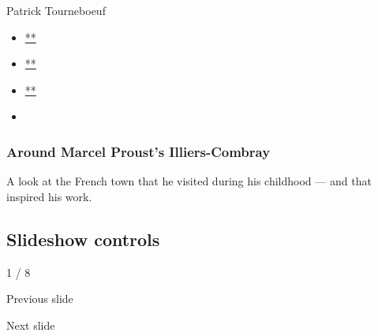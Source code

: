 Patrick Tourneboeuf

\begin{itemize}
\item
  \href{https://www.facebookcorewwwi.onion/sharer.php?app_id=9869919170\&u=https\%3A\%2F\%2Fwww.nytimes3xbfgragh.onion\%2Fslideshow\%2F2017\%2F05\%2F15\%2Ft-magazine\%2Faround-marcel-prousts-illiers-combray.html\%3Fsmid\%3Dfb-share\&name=Around\%20Marcel\%20Proust\%E2\%80\%99s\%20Illiers-Combray\&redirect_uri=https\%3A\%2F\%2Fwww.facebookcorewwwi.onion\%2F}{**}
\item
  \href{https://twitter.com/intent/tweet?url=https\%3A\%2F\%2Fwww.nytimes3xbfgragh.onion\%2Fslideshow\%2F2017\%2F05\%2F15\%2Ft-magazine\%2Faround-marcel-prousts-illiers-combray.html\%3Fsmid\%3Dtw-share\&text=Around\%20Marcel\%20Proust\%E2\%80\%99s\%20Illiers-Combray}{**}
\item
  \href{mailto:?subject=nytimes3xbfgragh.onion\%3A\%20Around\%20Marcel\%20Proust\%E2\%80\%99s\%20Illiers-Combray\&body=From\%20The\%20New\%20York\%20Times\%3A\%0A\%0AAround\%20Marcel\%20Proust\%E2\%80\%99s\%20Illiers-Combray\%0A\%0AA\%20look\%20at\%20the\%20French\%20town\%20that\%20he\%20visited\%20during\%20his\%20childhood\%20\%E2\%80\%94\%20and\%20that\%20inspired\%20his\%20work.\%0A\%0Ahttps\%3A\%2F\%2Fwww.nytimes3xbfgragh.onion\%2Fslideshow\%2F2017\%2F05\%2F15\%2Ft-magazine\%2Faround-marcel-prousts-illiers-combray.html\%3Fsmid\%3Dem-share}{**}
\item
\end{itemize}

\hypertarget{around-marcel-prousts-illiers-combray-1}{%
\subsubsection{Around Marcel Proust's
Illiers-Combray}\label{around-marcel-prousts-illiers-combray-1}}

A look at the French town that he visited during his childhood --- and
that inspired his work.

\hypertarget{slideshow-controls}{%
\subsection{Slideshow controls}\label{slideshow-controls}}

1 / 8

Previous slide

Next slide
